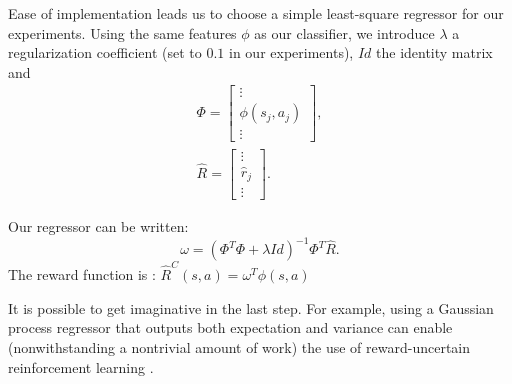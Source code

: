 \documentclass[smallextended]{svjour3}
\begin{document}
Ease of implementation leads us to choose a simple least-square regressor for our experiments. Using the same features $\phi$ as our classifier, we introduce $\lambda$ a regularization coefficient (set to $0.1$ in our experiments), $Id$ the identity matrix and 
\begin{eqnarray}
  \Phi = \begin{bmatrix}
    \vdots\\
    \phi(s_j,a_j)\\
    \vdots
  \end{bmatrix},\\
  \hat R = \begin{bmatrix}
    \vdots\\
    \hat r_j\\
    \vdots
  \end{bmatrix}.
\end{eqnarray}

Our regressor can be written:
\begin{equation}
  \omega = (\Phi^T\Phi + \lambda Id)^{-1}\Phi^T\hat R.
\end{equation}
The reward function is : $\hat R^C(s,a) = \omega^T \phi(s,a)$

It is possible to get imaginative in the last step. For example, using a Gaussian process regressor \cite{rasmussen2006gaussian} that outputs both expectation and variance can enable (nonwithstanding a nontrivial amount of work) the use of reward-uncertain reinforcement learning \cite{regan2011robust}. 
\end{document}
